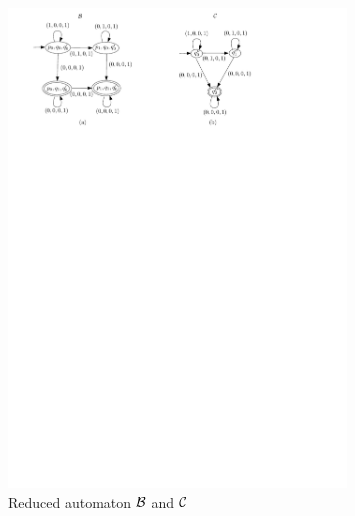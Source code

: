 \begin{figure}[ht]
  \centering
  \includegraphics[width = 0.8\textwidth]{sections/overview-cefa-reduced.pdf}
  \caption{Reduced automaton $\mathcal{B}$ and $\mathcal{C}$}
  \label{fig:overview:product:reduced}
\end{figure}



